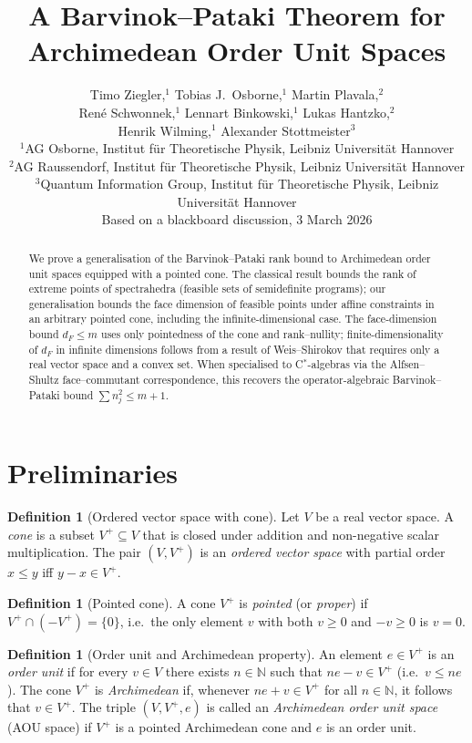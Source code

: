 \documentclass[11pt,a4paper]{article}
\title{A Barvinok--Pataki Theorem for Archimedean Order Unit Spaces}
\author{Timo Ziegler,$^{1}$
  Tobias J.\ Osborne,$^{1}$
  Martin Plavala,$^{2}$ \\
  Ren\'e Schwonnek,$^{1}$
  Lennart Binkowski,$^{1}$
  Lukas Hantzko,$^{2}$ \\
  Henrik Wilming,$^{1}$
  Alexander Stottmeister$^{3}$ \\[6pt]
  \small $^1$AG Osborne, Institut f\"ur Theoretische Physik,
    Leibniz Universit\"at Hannover \\
  \small $^2$AG Raussendorf, Institut f\"ur Theoretische Physik,
    Leibniz Universit\"at Hannover \\
  \small $^3$Quantum Information Group, Institut f\"ur Theoretische Physik,
    Leibniz Universit\"at Hannover \\[4pt]
  \small Based on a blackboard discussion, 3 March 2026}
\date{}
\theoremstyle{definition}
\newtheorem{definition}[theorem]{Definition}
\begin{document}
\maketitle

\begin{abstract}
We prove a generalisation of the Barvinok--Pataki rank bound to
Archimedean order unit spaces equipped with a pointed cone.  The
classical result bounds the rank of extreme points of spectrahedra
(feasible sets of semidefinite programs); our generalisation bounds the
face dimension of feasible points under affine constraints in an
arbitrary pointed cone, including the infinite-dimensional case.
The face-dimension bound $d_F \leq m$ uses only pointedness of the
cone and rank--nullity; finite-dimensionality of $d_F$ in infinite
dimensions follows from a result of Weis--Shirokov that requires
only a real vector space and a convex set.  When specialised to
C$^*$-algebras via the Alfsen--Shultz face--commutant correspondence,
this recovers the operator-algebraic Barvinok--Pataki bound
$\sum n_j^2 \leq m + 1$.
\end{abstract}

\section{Preliminaries}

\begin{definition}[Ordered vector space with cone]
Let $V$ be a real vector space.  A \emph{cone} is a subset
$V^+ \subseteq V$ that is closed under addition and non-negative
scalar multiplication.  The pair $(V, V^+)$ is an \emph{ordered
vector space} with partial order $x \leq y$ iff $y - x \in V^+$.
\end{definition}

\begin{definition}[Pointed cone]
A cone $V^+$ is \emph{pointed} (or \emph{proper}) if
$V^+ \cap (-V^+) = \{0\}$, i.e.\ the only element $v$ with both
$v \geq 0$ and $-v \geq 0$ is $v = 0$.
\end{definition}

\begin{definition}[Order unit and Archimedean property]
An element $e \in V^+$ is an \emph{order unit} if for every $v \in V$
there exists $n \in \mathbb{N}$ such that $ne - v \in V^+$ (i.e.\
$v \leq ne$).  The cone $V^+$ is \emph{Archimedean} if, whenever
$ne + v \in V^+$ for all $n \in \mathbb{N}$, it follows that
$v \in V^+$.  The triple $(V, V^+, e)$ is called an \emph{Archimedean
order unit space} (AOU space) if $V^+$ is a pointed Archimedean cone
and $e$ is an order unit.
\end{definition}
\end{document}
